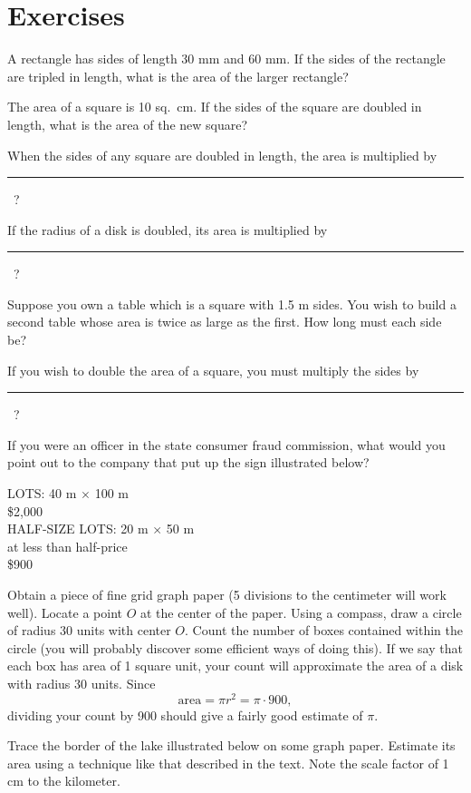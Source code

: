 \documentclass[12pt]{book} %
\begin{document}
\section*{Exercises}

\setcounter{Exercise}{0}
\begin{ExerciseList}
\Exercise A rectangle has sides of length 30 mm and 60 mm. If the sides of the rectangle are tripled in length, what is the area of the larger rectangle?

\Exercise The area of a square is 10 sq.\ cm. If the sides of the square are doubled in length, what is the area of the new square?

\Exercise When the sides of any square are doubled in length, the area is multiplied by \rule{2cm}{0.4pt}\ ?

\Exercise If the radius of a disk is doubled, its area is multiplied by \rule{2cm}{0.4pt}\ ?

\Exercise Suppose you own a table which is a square with 1.5 m sides. You wish to build a second table whose area is twice as large as the first. How long must each side be?

\Exercise If you wish to double the area of a square, you must multiply the sides by \rule{2cm}{0.4pt}\ ?

\Exercise If you were an officer in the state consumer fraud commission, what would you point out to the company that put up the sign illustrated below?
\begin{center}
LOTS: 40 m $\times$ 100 m\\
\$2,000\\[0.4em]
HALF-SIZE LOTS: 20 m $\times$ 50 m\\
at less than half-price\\
\$900
\end{center}

\Exercise Obtain a piece of fine grid graph paper (5 divisions to the centimeter will work well). Locate a point $O$ at the center of the paper. Using a compass, draw a circle of radius 30 units with center $O$. Count the number of boxes contained within the circle (you will probably discover some efficient ways of doing this). If we say that each box has area of 1 square unit, your count will approximate the area of a disk with radius 30 units. Since
\[
\text{area}=\pi r^2=\pi\cdot 900,
\]
dividing your count by 900 should give a fairly good estimate of $\pi$.

\Exercise Trace the border of the lake illustrated below on some graph paper. Estimate its area using a technique like that described in the text.
Note the scale factor of 1 cm to the kilometer.


\end{ExerciseList}
\end{document}

